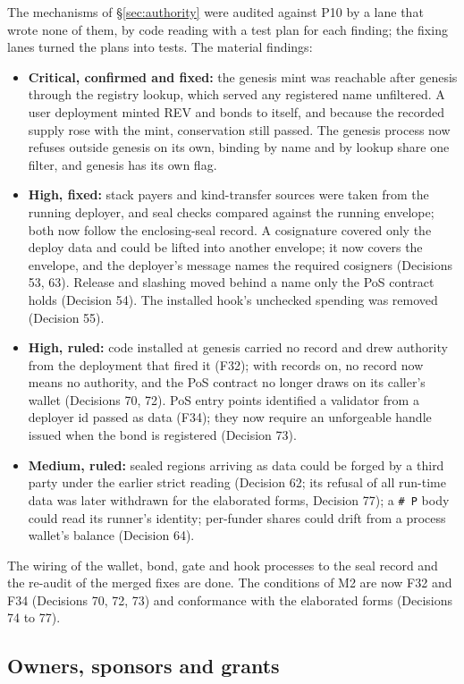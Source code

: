 \documentclass[11pt]{article}
\begin{document}
The mechanisms of \S\ref{sec:authority} were audited against P10 by a lane that wrote none of them, by code reading with a test plan for each finding; the fixing lanes turned the plans into tests. The material findings:
\begin{itemize}
\item \textbf{Critical, confirmed and fixed:} the genesis mint was reachable after genesis through the registry lookup, which served any registered name unfiltered. A user deployment minted REV and bonds to itself, and because the recorded supply rose with the mint, conservation still passed. The genesis process now refuses outside genesis on its own, binding by name and by lookup share one filter, and genesis has its own flag.
\item \textbf{High, fixed:} stack payers and kind-transfer sources were taken from the running deployer, and seal checks compared against the running envelope; both now follow the enclosing-seal record. A cosignature covered only the deploy data and could be lifted into another envelope; it now covers the envelope, and the deployer's message names the required cosigners (Decisions 53, 63). Release and slashing moved behind a name only the PoS contract holds (Decision 54). The installed hook's unchecked spending was removed (Decision 55).
\item \textbf{High, ruled:} code installed at genesis carried no record and drew authority from the deployment that fired it (F32); with records on, no record now means no authority, and the PoS contract no longer draws on its caller's wallet (Decisions 70, 72). PoS entry points identified a validator from a deployer id passed as data (F34); they now require an unforgeable handle issued when the bond is registered (Decision 73).
\item \textbf{Medium, ruled:} sealed regions arriving as data could be forged by a third party under the earlier strict reading (Decision 62; its refusal of all run-time data was later withdrawn for the elaborated forms, Decision 77); a \texttt{\# P} body could read its runner's identity; per-funder shares could drift from a process wallet's balance (Decision 64).
\end{itemize}
The wiring of the wallet, bond, gate and hook processes to the seal record and the re-audit of the merged fixes are done. The conditions of M2 are now F32 and F34 (Decisions 70, 72, 73) and conformance with the elaborated forms (Decisions 74 to 77).

\subsection{Owners, sponsors and grants}
\end{document}
